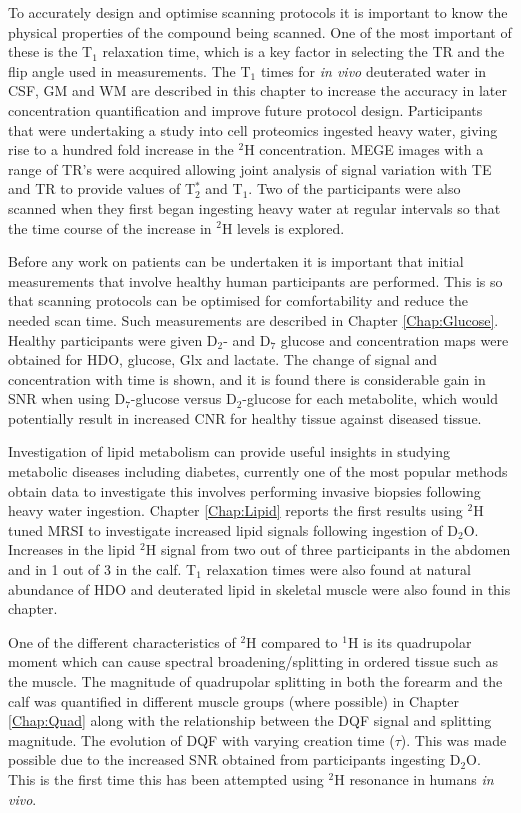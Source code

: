 To accurately design and optimise scanning protocols it is important to know the physical properties of the compound being scanned. One of the most important of these is the T$_1$ relaxation time, which is a key factor in selecting the \ac{TR} and the flip angle used in measurements. The T$_1$ times for \textit{in vivo} deuterated water in \ac{CSF}, \ac{GM} and \ac{WM} are described in this chapter to increase the accuracy in later concentration quantification and improve future protocol design. Participants that were undertaking a study into cell proteomics ingested heavy water, giving rise to a hundred fold increase in the $^2$H concentration. \ac{MEGE} images with a range of \ac{TR}'s were acquired allowing joint analysis of signal variation with \ac{TE} and \ac{TR} to provide values of T$_2^*$ and T$_1$. Two of the participants were also scanned when they first began ingesting heavy water at regular intervals so that the time course of the increase in $^2$H levels is explored.

Before any work on patients can be undertaken it is important that initial measurements that involve healthy human participants are performed. This is so that scanning protocols can be optimised for comfortability and reduce the needed scan time. Such measurements are described in Chapter \ref{Chap:Glucose}. Healthy participants were given D$_2$- and D$_7$ glucose and concentration maps were obtained for \ac{HDO}, glucose, Glx and lactate. The change of signal and concentration with time is shown, and it is found there is considerable gain in \ac{SNR} when using D$_7$-glucose versus D$_2$-glucose for each metabolite, which would potentially result in increased \ac{CNR} for healthy tissue against diseased tissue.

Investigation of lipid metabolism can provide useful insights in studying metabolic diseases including diabetes, currently one of the most popular methods obtain data to investigate this involves performing invasive biopsies following heavy water ingestion. Chapter \ref{Chap:Lipid} reports the first results using $^2$H tuned MRSI to investigate increased lipid signals following ingestion of D$_2$O. Increases in the lipid $^2$H signal from two out of three participants in the abdomen and in 1 out of 3 in the calf. T$_1$ relaxation times were also found at natural abundance of \ac{HDO} and deuterated lipid in skeletal muscle were also found in this chapter.

One of the different characteristics of $^2$H compared to $^1$H is its quadrupolar moment which can cause spectral broadening/splitting in ordered tissue such as the muscle. The magnitude of quadrupolar splitting in both the forearm and the calf was quantified in different muscle groups (where possible) in Chapter \ref{Chap:Quad} along with the relationship between the \ac{DQF} signal and splitting magnitude. The evolution of \ac{DQF} with varying creation time ($\tau$). This was made possible due to the increased \ac{SNR} obtained from participants ingesting D$_2$O. This is the first time this has been attempted using $^2$H resonance in humans \textit{in vivo}. 

